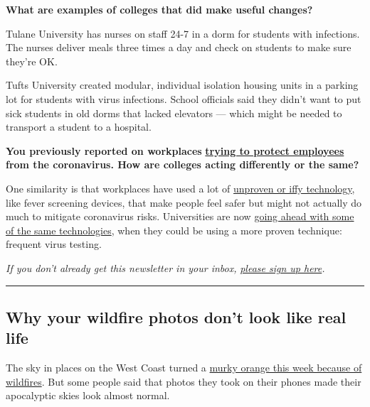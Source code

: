 \textbf{What are examples of colleges that did make useful changes?}

Tulane University has nurses on staff 24-7 in a dorm for students with
infections. The nurses deliver meals three times a day and check on
students to make sure they're OK.

Tufts University created modular, individual isolation housing units in
a parking lot for students with virus infections. School officials said
they didn't want to put sick students in old dorms that lacked elevators
--- which might be needed to transport a student to a hospital.

\textbf{You previously reported on workplaces}
\textbf{\href{https://www.nytimes3xbfgragh.onion/2020/06/22/business/virus-office-workplace-return.html}{trying
to protect employees}} \textbf{from the coronavirus. How are colleges
acting differently or the same?}

One similarity is that workplaces have used a lot of
\href{https://www.nytimes3xbfgragh.onion/2020/05/11/technology/coronavirus-worker-testing-privacy.html}{unproven
or iffy technology}, like fever screening devices, that make people feel
safer but might not actually do much to mitigate coronavirus risks.
Universities are now
\href{https://www.nytimes3xbfgragh.onion/2020/08/19/business/alabama-uab-coronavirus-tests.html}{going
ahead with some of the same technologies}, when they could be using a
more proven technique: frequent virus testing.

\emph{If you don't already get this newsletter in your inbox,}
\href{https://www.nytimes3xbfgragh.onion/newsletters/signup/OT}{\emph{please
sign up here}}\emph{.}

\begin{center}\rule{0.5\linewidth}{\linethickness}\end{center}

\hypertarget{why-your-wildfire-photos-dont-look-like-real-life}{%
\subsection{Why your wildfire photos don't look like real
life}\label{why-your-wildfire-photos-dont-look-like-real-life}}

The sky in places on the West Coast turned a
\href{https://www.nytimes3xbfgragh.onion/2020/09/09/us/pictures-photos-california-fires.html}{murky
orange this week because of wildfires}. But some people said that photos
they took on their phones made their apocalyptic skies look almost
normal.

